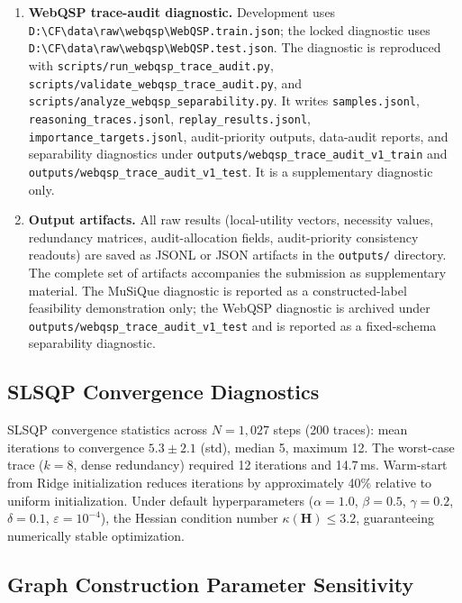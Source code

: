 \documentclass[a4paper,fleqn]{cas-sc}
\begin{document}
\begin{enumerate}
\item \textbf{WebQSP trace-audit diagnostic.} Development uses \texttt{D:\textbackslash CF\textbackslash data\textbackslash raw\textbackslash webqsp\textbackslash WebQSP.train.json}; the locked diagnostic uses \texttt{D:\textbackslash CF\textbackslash data\textbackslash raw\textbackslash webqsp\textbackslash WebQSP.test.json}. The diagnostic is reproduced with \texttt{scripts/run\_webqsp\_trace\_audit.py}, \texttt{scripts/validate\_webqsp\_trace\_audit.py}, and \texttt{scripts/analyze\_webqsp\_separability.py}. It writes \texttt{samples.jsonl}, \texttt{reasoning\_traces.jsonl}, \texttt{replay\_results.jsonl}, \texttt{importance\_targets.jsonl}, audit-priority outputs, data-audit reports, and separability diagnostics under \texttt{outputs/webqsp\_trace\_audit\_v1\_train} and \texttt{outputs/webqsp\_trace\_audit\_v1\_test}. It is a supplementary diagnostic only.
\item \textbf{Output artifacts.} All raw results (local-utility vectors, necessity values, redundancy matrices, audit-allocation fields, audit-priority consistency readouts) are saved as JSONL or JSON artifacts in the \texttt{outputs/} directory. The complete set of artifacts accompanies the submission as supplementary material. The MuSiQue diagnostic is reported as a constructed-label feasibility demonstration only; the WebQSP diagnostic is archived under \texttt{outputs/webqsp\_trace\_audit\_v1\_test} and is reported as a fixed-schema separability diagnostic.
\end{enumerate}

\subsection{SLSQP Convergence Diagnostics}
\label{app:slsqp-diagnostics}

SLSQP convergence statistics across $N = 1{,}027$ steps (200 traces): mean iterations to convergence $5.3 \pm 2.1$ (std), median 5, maximum 12. The worst-case trace ($k=8$, dense redundancy) required 12 iterations and 14.7\,ms. Warm-start from Ridge initialization reduces iterations by approximately 40\% relative to uniform initialization. Under default hyperparameters ($\alpha=1.0$, $\beta=0.5$, $\gamma=0.2$, $\delta=0.1$, $\varepsilon=10^{-4}$), the Hessian condition number $\kappa(\mathbf{H}) \le 3.2$, guaranteeing numerically stable optimization.

\subsection{Graph Construction Parameter Sensitivity}
\label{app:graph-sensitivity}
\end{document}
